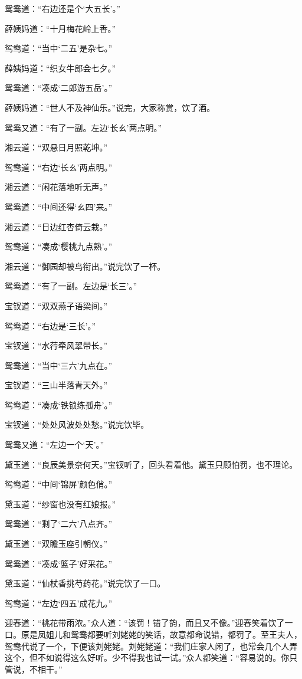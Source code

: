 \documentclass[12pt,oneside]{book}
\begin{document}
鸳鸯道：“右边还是个‘大五长’。”

薛姨妈道：“十月梅花岭上香。”

鸳鸯道：“当中‘二五’是杂七。”

薛姨妈道：“织女牛郎会七夕。”

鸳鸯道：“凑成‘二郎游五岳’。”

薛姨妈道：“世人不及神仙乐。”说完，大家称赏，饮了酒。

鸳鸯又道：“有了一副。左边‘长ㄠ’两点明。”

湘云道：“双悬日月照乾坤。”

鸳鸯道：“右边‘长ㄠ’两点明。”

湘云道：“闲花落地听无声。”

鸳鸯道：“中间还得‘ㄠ四’来。”

湘云道：“日边红杏倚云栽。”

鸳鸯道：“凑成‘樱桃九点熟’。”

湘云道：“御园却被鸟衔出。”说完饮了一杯。

鸳鸯道：“有了一副。左边是‘长三’。”

宝钗道：“双双燕子语梁间。”

鸳鸯道：“右边是‘三长’。”

宝钗道：“水荇牵风翠带长。”

鸳鸯道：“当中‘三六’九点在。”

宝钗道：“三山半落青天外。”

鸳鸯道：“凑成‘铁锁练孤舟’。”

宝钗道：“处处风波处处愁。”说完饮毕。

鸳鸯又道：“左边一个‘天’。”

黛玉道：“良辰美景奈何天。”宝钗听了，回头看着他。黛玉只顾怕罚，也不理论。

鸳鸯道：“中间‘锦屏’颜色俏。”

黛玉道：“纱窗也没有红娘报。”

鸳鸯道：“剩了‘二六’八点齐。”

黛玉道：“双瞻玉座引朝仪。”

鸳鸯道：“凑成‘篮子’好采花。”

黛玉道：“仙杖香挑芍药花。”说完饮了一口。

鸳鸯道：“左边‘四五’成花九。”

迎春道：“桃花带雨浓。”众人道：“该罚！错了韵，而且又不像。”迎春笑着饮了一口。原是凤姐儿和鸳鸯都要听刘姥姥的笑话，故意都命说错，都罚了。至王夫人，鸳鸯代说了一个，下便该刘姥姥。刘姥姥道：“我们庄家人闲了，也常会几个人弄这个，但不如说得这么好听。少不得我也试一试。”众人都笑道：“容易说的。你只管说，不相干。”
\end{document}
